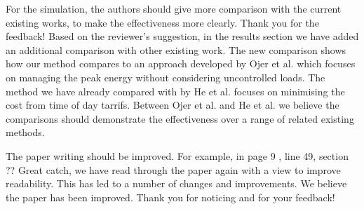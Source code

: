 \documentclass{article}
\begin{document}
\begin{buttkissing}
	
	\reviewerclaims For the simulation, the authors should give more comparison with the current existing works, to make the effectiveness more clearly.
	\kissbutt Thank you for the feedback! Based on the reviewer's suggestion, in the results section we have added an additional comparison with other existing work. The new comparison shows how our method compares to an approach developed by Ojer et al. which focuses on managing the peak energy without considering uncontrolled loads. The method we have already compared with by He et al. focuses on minimising the cost from time of day tarrifs. Between Ojer et al. and He et al. we believe the comparisons should demonstrate the effectiveness over a range of related existing methods.
	
	\reviewerclaims The paper writing should be improved. For example, in page 9 , line 49, section ??
	\kissbutt Great catch, we have read through the paper again with a view to improve readability. This has led to a number of changes and improvements. We believe the paper has been improved. Thank you for noticing and for your feedback!
\end{buttkissing}
\end{document}
